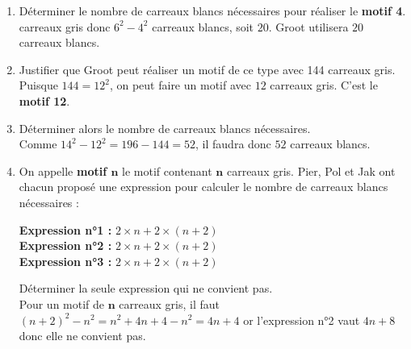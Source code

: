 \begin{corrige}
    \begin{enumerate}
        \item Déterminer le nombre de carreaux blancs nécessaires pour réaliser le {\bfseries motif 4}.\\
        { carreaux gris donc $6^2-4^2$ carreaux blancs, soit $20$. Groot utilisera $20$ carreaux blancs.}
        \item Justifier que Groot peut réaliser un motif de ce type avec \num{144} carreaux gris.\\
        Puisque $144=12^2$, on peut faire un motif avec $12$ carreaux gris. C'est le {\bfseries motif 12}.
        \item Déterminer alors le nombre de carreaux blancs nécessaires.\\
        {\red Comme $14^2-12^2=196-144=52$, il faudra donc $52$ carreaux blancs.}
        \item On appelle {\bfseries motif $\boldsymbol{n}$} le motif contenant {\bfseries $\boldsymbol{n}$} carreaux gris. Pier, Pol et Jak ont chacun proposé une expression
        pour calculer le nombre de carreaux blancs nécessaires :\\
        \begin{itemize}
            \def\item{}
            \item {\bfseries Expression n°1 : }$2\times n + 2\times(n+2)$\\
            \item {\bfseries Expression n°2 : }$2\times n + 2\times(n+2)$\\
            \item {\bfseries Expression n°3 : }$2\times n + 2\times(n+2)$\\
        \end{itemize}
        Déterminer la seule expression qui ne convient pas.\\
        {\red Pour un motif de {\bfseries $\boldsymbol{n}$} carreaux gris, il faut $(n+2)^2-n^2=n^2+4n+4-n^2=4n+4$ or l'expression n°2 vaut $4n+8$ donc elle ne convient pas.}
    \end{enumerate}
\end{corrige}

